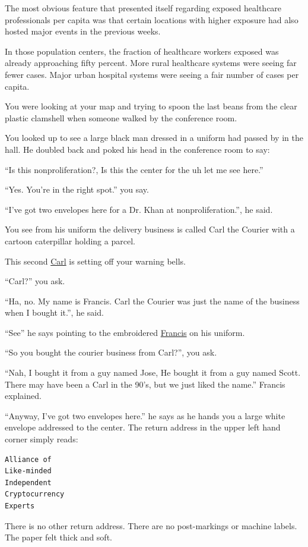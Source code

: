 \documentclass[17pt, twoside, a5paper, openright, extrafontsizes]{memoir}
\renewcommand{\emph}[1]{\ul{#1}}
\begin{document}
The most obvious feature that presented itself regarding exposed
healthcare professionals per capita was that certain locations with
higher exposure had also hosted major events in the previous weeks.

In those population centers, the fraction of healthcare workers exposed
was already approaching fifty percent. More rural healthcare systems
were seeing far fewer cases. Major urban hospital systems were seeing a
fair number of cases per capita.

You were looking at your map and trying to spoon the last beans from the
clear plastic clamshell when someone walked by the conference room.

You looked up to see a large black man dressed in a uniform had passed
by in the hall. He doubled back and poked his head in the conference
room to say:

``Is this nonproliferation?, Is this the center for the uh let me see
here.''

``Yes. You're in the right spot.'' you say.

``I've got two envelopes here for a Dr. Khan at nonproliferation.'', he
said.

You see from his uniform the delivery business is called Carl the
Courier with a cartoon caterpillar holding a parcel.

This second \emph{Carl} is setting off your warning bells.

``Carl?'' you ask.

``Ha, no. My name is Francis. Carl the Courier was just the name of the
business when I bought it.'', he said.

``See'' he says pointing to the embroidered \emph{Francis} on his
uniform.

``So you bought the courier business from Carl?'', you ask.

``Nah, I bought it from a guy named Jose, He bought it from a guy named
Scott. There may have been a Carl in the 90's, but we just liked the
name.'' Francis explained.

``Anyway, I've got two envelopes here.'' he says as he hands you a large
white envelope addressed to the center. The return address in the upper
left hand corner simply reads:
\newpage
\begin{verbatim}
Alliance of
Like-minded
Independent
Cryptocurrency
Experts
\end{verbatim}

There is no other return address. There are no post-markings or machine
labels. The paper felt thick and soft.
\end{document}
